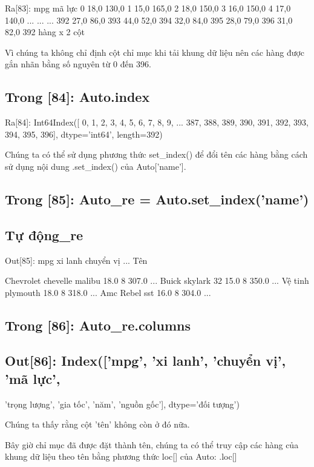Ra[83]: mpg mã lực 0 18,0 130,0 1 15,0 165,0 2 18,0 150,0 3 16,0 150,0 4 17,0 140,0 ... ... ... 392 27,0 86,0 393 44,0 52,0 394 32,0 84,0 395 28,0 79,0 396 31,0 82,0 392 hàng x 2 cột

Vì chúng ta không chỉ định cột chỉ mục khi tải khung dữ liệu nên các hàng được gắn nhãn bằng số nguyên từ 0 đến 396.

\subsection{Trong [84]: Auto.index}

Ra[84]: Int64Index([ 0, 1, 2, 3, 4, 5, 6, 7, 8, 9, ... 387, 388, 389, 390, 391, 392, 393, 394, 395, 396], dtype='int64', length=392)

Chúng ta có thể sử dụng phương thức set\_index() để đổi tên các hàng bằng cách sử dụng nội dung .set\_index() của Auto['name'].

\subsection{Trong [85]: Auto\_re = Auto.set\_index('name')}

\subsection{Tự động\_re}

Out[85]: mpg xi lanh chuyển vị ... Tên

Chevrolet chevelle malibu 18.0 8 307.0 ... Buick skylark 32 15.0 8 350.0 ... Vệ tinh plymouth 18.0 8 318.0 ... Amc Rebel sst 16.0 8 304.0 ...

\subsection{Trong [86]: Auto\_re.columns}

\subsection{Out[86]: Index(['mpg', 'xi lanh', 'chuyển vị', 'mã lực',}

'trọng lượng', 'gia tốc', 'năm', 'nguồn gốc'], dtype='đối tượng')

Chúng ta thấy rằng cột 'tên' không còn ở đó nữa.

Bây giờ chỉ mục đã được đặt thành tên, chúng ta có thể truy cập các hàng của khung dữ liệu theo tên bằng phương thức loc[] của Auto: .loc[]


